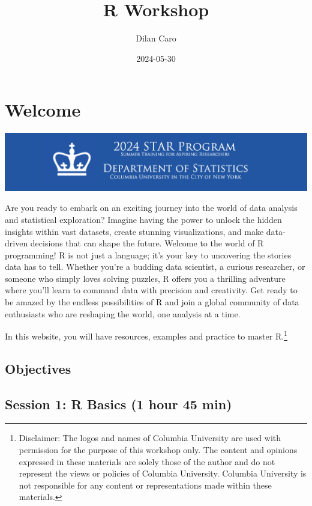 \documentclass[
]{book}
\title{R Workshop}
\author{Dilan Caro}
\date{2024-05-30}
\begin{document}
\maketitle

{
\setcounter{tocdepth}{1}
\tableofcontents
}
\chapter*{Welcome}\label{welcome}

\includegraphics[width=1\linewidth]{images/CU STAR}

Are you ready to embark on an exciting journey into the world of data analysis and statistical exploration? Imagine having the power to unlock the hidden insights within vast datasets, create stunning visualizations, and make data-driven decisions that can shape the future. Welcome to the world of R programming! R is not just a language; it's your key to uncovering the stories data has to tell. Whether you're a budding data scientist, a curious researcher, or someone who simply loves solving puzzles, R offers you a thrilling adventure where you'll learn to command data with precision and creativity. Get ready to be amazed by the endless possibilities of R and join a global community of data enthusiasts who are reshaping the world, one analysis at a time.

In this website, you will have resources, examples and practice to master R.\footnote{Disclaimer: The logos and names of Columbia University are used with permission for the purpose of this workshop only. The content and opinions expressed in these materials are solely those of the author and do not represent the views or policies of Columbia University. Columbia University is not responsible for any content or representations made within these materials.}

\section*{Objectives}\label{objectives}

\section*{Session 1: R Basics (1 hour 45 min)}\label{session-1-r-basics-1-hour-45-min}
\end{document}
